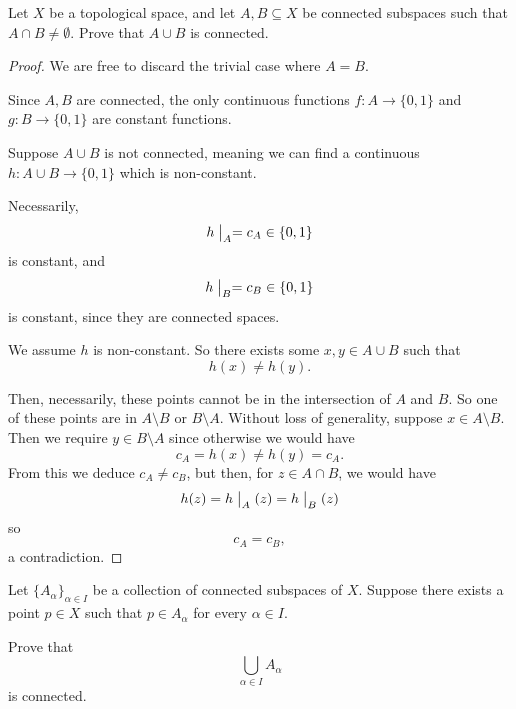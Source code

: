 \documentclass[11pt]{article}
\begin{document}
\begin{prob}
    Let $X$ be a topological space, and let 
    $A,B \subseteq X$ be connected subspaces such that 
    $A \cap B \neq \emptyset$. 
    Prove that $A \cup B$ is connected. 
\end{prob}
\begin{proof}
    We are free to discard the trivial case where 
    $A = B$. 

    Since $A,B$ are connected, 
    the only continuous functions $f : A \to \{0,1\}$ 
    and $g : B \to \{0,1\}$ are constant functions. 

    Suppose $A \cup B$ is not connected, meaning 
    we can find a continuous $h : A \cup B\to \{0,1\}$ which 
    is non-constant. 

    Necessarily, 
    \[
        h\bigm|_A = c_A \in \{0,1\}
    \]
    is constant, and 
    \[
        h\bigm|_B = c_B \in \{0,1\}
    \]
    is constant, since they are connected spaces. 

    We assume $h$ is non-constant. So there exists 
    some $x,y \in A \cup B$ such that 
    \[
        h(x) \neq h(y). 
    \]

    Then, necessarily, these points cannot be in 
    the intersection of $A$ and $B$. 
    So one of these points are in $A \setminus B$ or 
    $B \setminus A$. Without loss of generality, 
    suppose $x \in A \setminus B$. 
    Then we require $y \in B \setminus A$ since otherwise 
    we would have 
    \[
        c_A = h(x) \neq h(y) = c_A. 
    \]    
    From this we deduce $c_A \neq c_B$, but then, for 
    $z \in A \cap B$, we would have 
    \[
        h(z) = h\bigm|_A(z) = h\bigm|_B(z) 
    \]
    so 
    \[
        c_A = c_B, 
    \]
    a contradiction.
\end{proof}

\begin{prob}
    Let $\{A_\alpha\}_{\alpha \in I}$ be a 
    collection of connected subspaces of $X$. Suppose 
    there exists a point $p \in X$ such that 
    $p \in A_\alpha$ for every $\alpha \in I$. 

    Prove that 
    \[
        \bigcup_{\alpha \in I} A_\alpha 
    \]
    is connected. 
\end{prob}
\end{document}
